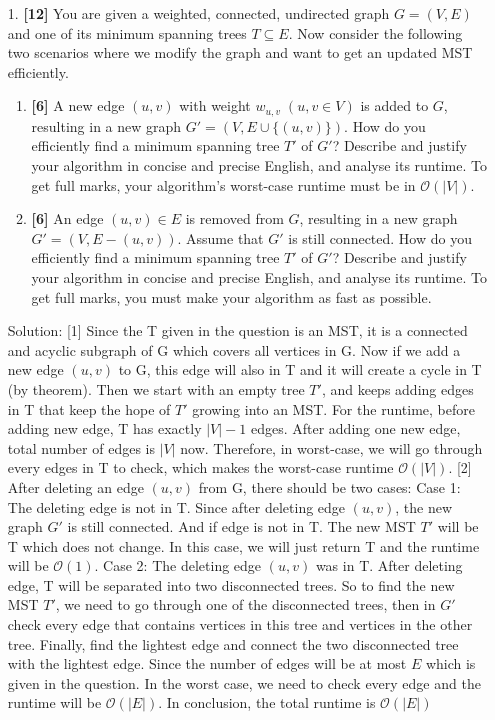 \documentclass{assignment-263}
\begin{document}
\think
\begin{enumerate}
	\item[1.] \textbf{[12]}
		You are given a weighted, connected, undirected graph $G=(V, E)$ and
		one of its minimum spanning trees $T\subseteq E$. Now consider the
		following two scenarios where we modify the graph and want to get an
		updated MST efficiently.
		\begin{enumerate}
			\item \textbf{[6]}
				A new edge $(u, v)$ with weight $w_{u, v}\;(u, v\in V)$ is
				added to $G$, resulting in a new graph $G'=(V, E\cup \{(u,
				v)\})$. How do you efficiently find a minimum spanning tree
				$T'$ of $G'$? Describe and justify your algorithm in concise
				and precise English, and analyse its runtime. To get full
				marks, your algorithm's worst-case runtime must be in
				$\mathcal{O}(|V|)$.

			\item \textbf{[6]}
				An edge $(u, v)\in E$ is removed from $G$, resulting in a
				new graph $G'=(V, E-(u, v))$. Assume that $G'$ is still
				connected. How do you efficiently find a minimum spanning
				tree $T'$ of $G'$?  Describe and justify your algorithm in
				concise and precise English, and analyse its runtime. To get
				full marks, you must make your algorithm as fast as
				possible.
		\end{enumerate}
Solution: \vskip5pt
[1] Since the T given in the question is an MST, it is a connected and acyclic subgraph of G which covers all vertices in G. Now if we add a new edge $(u, v)$ to G, this edge will also in T and it will create a cycle in T (by theorem). 
Then we start with an empty tree $T'$, and keeps adding edges in T that keep the hope of $T'$ growing into an MST. For the runtime, before adding new edge, T has exactly $|V| -1 $ edges. After adding one new edge, total number of edges is $|V|$ now. Therefore, in worst-case, we will go through every edges in T to check, which makes the worst-case runtime $\mathcal{O}(|V|)$.\vskip5pt
[2] After deleting an edge $(u, v)$ from G, there should be two cases:\vskip5pt
Case 1: The deleting edge is not in T. Since after deleting edge $(u, v)$, the new graph $G'$ is still connected. And if edge is not in T. The new MST $T'$ will be T which does not change. In this case, we will just return T and the runtime will be $\mathcal{O}(1)$.\vskip5pt
Case 2: The deleting edge $(u, v)$ was in T. After deleting edge, T will be separated into two disconnected trees. So to find the new MST $T'$, we need to go through one of the disconnected trees, then in $G'$ check every edge that contains vertices in this tree and vertices in the other tree. Finally, find the lightest edge and connect the two disconnected tree with the lightest edge. Since the number of edges will be at most $E$ which is given in the question. In the worst case, we need to check every edge and the runtime will be $\mathcal{O}(|E|)$.\vskip5pt
In conclusion, the total runtime is $\mathcal{O}(|E|)$


\end{enumerate}
\end{document}
